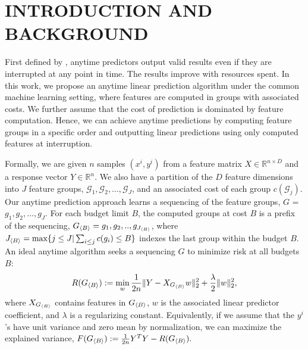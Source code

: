 \section{INTRODUCTION AND BACKGROUND}

First defined by \cite{anytime}, anytime predictors output 
valid results even if they are interrupted at any point in time. The results improve with resources spent. In this work, we propose an anytime linear prediction algorithm under the common 
machine learning setting, where features are computed in groups with associated costs. We further assume that the cost of 
prediction is dominated by feature computation. Hence, 
we can achieve anytime predictions by computing feature groups
in a specific order and outputting linear predictions 
using only computed features at interruption.

Formally, we are given $n$ samples $(x^i, y^i)$ from 
a feature matrix $X \in \mathbb{R}^{n \times D}$ and a response vector $Y \in \mathbb{R}^n$. We also have a partition of the
$D$ feature dimensions into $J$ feature groups, 
$\mathcal{G}_1, \mathcal{G}_2, ..., \mathcal{G}_J$, and 
an associated cost of each group $c(\mathcal{G}_j)$. Our anytime prediction approach learns a sequencing of the
feature groups, $G$ = $g_1, g_2,..., g_J$. 
For each budget limit $B$, the computed
groups at cost $B$ is a prefix of the sequencing, $G_{\langle B \rangle} = g_1, g_2,.., g_{J_{\langle B \rangle}}$, 
where 
$J_{\langle B \rangle} = \max \{ j\leq J | \sum _{i\leq j} c(g_i) \leq B \}$ indexes the last group within the budget $B$. 
An ideal anytime algorithm seeks a sequencing $G$ to minimize risk at all budgets $B$:
\begin{align}
\label{eq:risk}
R(G_{\langle B \rangle}) :=   \min _{w}
    \frac{1}{2n} \Vert Y - X_{{G_{\langle B \rangle}}} {w} \Vert_2^2 + \frac{\lambda}{2} \Vert w\Vert_2^2,
\end{align}
where $X_{G_{\langle B \rangle}}$ contains features in $G_{\langle B \rangle}$, $w$ is the associated linear predictor coefficient, and $\lambda$ is a regularizing constant.
Equivalently, if we assume that the $y^i$'s have unit variance and zero mean by normalization, we can maximize the explained variance, 
$    \label{eq:exp-var}
    F(G_{\langle B \rangle}) := \frac{1}{2n} Y^TY - R(G_{\langle B \rangle}). $


